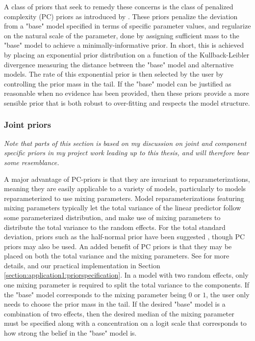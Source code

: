 A class of priors that seek to remedy these concerns is the class of penalized complexity (PC) priors as introduced by \cite{PC-priors}. These priors penalize the deviation from a "base" model specified in terms of specific parameter values, and regularize on the natural scale of the parameter, done by assigning sufficient mass to the "base" model to achieve a minimally-informative prior. In short, this is achieved by placing an exponential prior distribution on a function of the Kullback-Leibler divergence measuring the distance between the "base" model and alternative models. The rate of this exponential prior is then selected by the user by controlling the prior mass in the tail. If the "base" model can be justified as reasonable when no evidence has been provided, then these priors provide a more sensible prior that is both robust to over-fitting and respects the model structure.

\subsubsection{Joint priors}
\label{section:joint_priors}
\textit{Note that parts of this section is based on my discussion on joint and component specific priors in my project work \citep{Prosjektoppgave} leading up to this thesis, and will therefore bear some resemblance.}

A major advantage of PC-priors is that they are invariant to reparameterizations, meaning they are easily applicable to a variety of models, particularly to models reparameterized to use mixing parameters. Model reparameterizations featuring mixing parameters typically let the total variance of the linear predictor follow some parameterized distribution, and make use of mixing parameters to distribute the total variance to the random effects. For the total standard deviation, priors such as the half-normal prior have been suggested \citep{gelmanHN}, though PC priors may also be used. An added benefit of PC priors is that they may be placed on both the total variance and the mixing parameters. See \cite{Jointprior} for more details, and our practical implementation in Section \ref{section:application1:priorspecification}. In a model with two random effects, only one mixing parameter is required to split the total variance to the components. If the "base" model corresponds to the mixing parameter being $0$ or $1$, the user only needs to choose the prior mass in the tail. If the desired "base" model is a combination of two effects, then the desired median of the mixing parameter must be specified along with a concentration on a logit scale that corresponds to how strong the belief in the "base" model is. 

